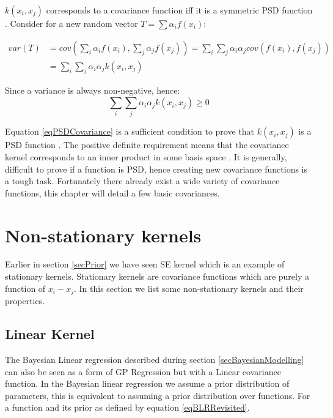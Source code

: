 $k(x_{i}, x_{j})$ corresponds to a covariance function iff it is a symmetric PSD function \cite{loeve1978probability, durrande2001etude}. Consider for a new random vector $T = \sum \alpha_{i}f(x_{i})$:

\begin{equation}\label{eqDerivePSDCovariance}
    \begin{aligned}
        var(T) & = cov\left ( \sum_{i} \alpha_{i}f(x_{i}), \sum_{j} \alpha_{j}f(x_{j}) \right ) = \sum_{i}\sum_{j}\alpha_{i}\alpha_{j}cov(f(x_{i}), f(x_{j})) \\
& = \sum_{i}\sum_{j}\alpha_{i}\alpha_{j}k(x_{i}, x_{j})
    \end{aligned}
\end{equation}

Since a variance is always non-negative, hence:
\begin{equation}\label{eqPSDCovariance}
\sum_{i}\sum_{j}\alpha_{i}\alpha_{j}k(x_{i}, x_{j}) \geq 0
\end{equation}

Equation \ref{eqPSDCovariance} is a sufficient condition to prove that $k(x_{i}, x_{j})$ is a PSD function \cite{mercer1909functions}. The positive definite requirement means that the covariance kernel corresponds to an inner product in some basis space \cite{bishop2006pattern}. It is generally, difficult to prove if a function is PSD, hence creating new covariance functions is a tough task. Fortunately there already exist a wide variety of covariance functions, this chapter will detail a few basic covariances. 

\section{Non-stationary kernels}\label{secNonStationaryKernels}
Earlier in section \ref{secPrior} we have seen SE kernel which is an example of stationary kernels. Stationary kernels are covariance functions which are purely a function of $x_{i} - x_{j}$. In this section we list some non-stationary kernels and their properties. 

\subsection{Linear Kernel} \label{subSecCh4LinearKernel}
The Bayesian Linear regression described during section \ref{secBayesianModelling} can also be seen as a form of GP Regression but with a Linear covariance function. In the Bayesian linear regression we assume a prior distribution of parameters, this is equivalent to assuming a prior distribution over functions. For a function and its prior as defined by equation \ref{eqBLRRevisited}.

